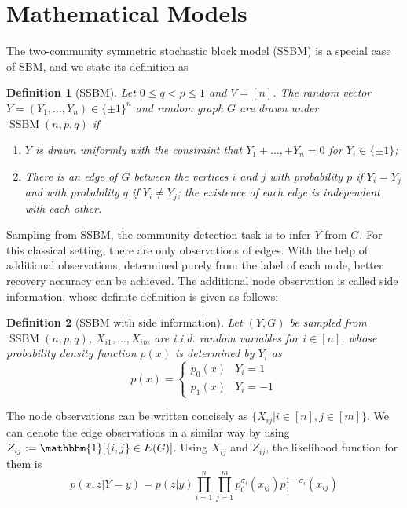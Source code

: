 \documentclass[conference]{IEEEtran}
\newtheorem{definition}{Definition}
\DeclareMathOperator{\SSBM}{SSBM}
\begin{document}
\section{Mathematical Models}
The two-community symmetric stochastic block model (SSBM) is a special case of SBM, and we state
its definition as
\begin{definition}[SSBM]
	Let $0\leq q<p\leq 1$ and $V=[n]$. The random vector $Y=(Y_1,\dots,Y_n)\in \{\pm 1\}^n$ and random graph $G$ are drawn under $\SSBM(n,p,q)$ if
	\begin{enumerate}
		\item $Y$ is drawn uniformly with the constraint that $Y_1 + \dots, + Y_n = 0$ for $Y_i \in \{\pm 1 \}$;
		
		\item There is an edge of $G$ between the vertices $i$ and $j$ with probability $p$ if $Y_i=Y_j$ and with probability $q$ if $Y_i \neq Y_j$; the existence of each edge is independent with each other.
	\end{enumerate}
\end{definition}
Sampling from SSBM, the community detection task is to infer $Y$ from $G$.
For this classical setting, there are only observations of edges. With the help of
additional observations, determined purely from the label of each node, better recovery
accuracy can be achieved. The additional node observation is called side information, whose
definite definition is given as follows:
\begin{definition}[SSBM with side information]
	Let $(Y,G)$ be sampled from $\SSBM(n,p,q)$, $X_{i1}, \dots, X_{im}$ are i.i.d. random variables for $i \in [n]$,
	whose probability density function $p(x)$ is determined by $Y_i$ as
	\begin{equation}
	p(x) = \begin{cases}
	p_0(x) & Y_i = 1 \\
	p_1(x) & Y_i = -1
	\end{cases}
	\end{equation}
\end{definition}
The node observations can be written concisely as $\{X_{ij} | i \in [n], j \in [m]\}$.
We can denote the edge observations in a similar way by using $Z_{ij}:=\mathbbm{1}[\{i,j\} \in E(G)]$.
Using $X_{ij}$ and $Z_{ij}$, the likelihood function for them is
\begin{equation}\label{eq:lh}
    p(x, z| Y=y) = p(z|y)\prod_{i=1}^n \prod_{j=1}^m p^{\sigma_i}_0(x_{ij})p^{1-\sigma_i}_1(x_{ij}) 
\end{equation}
\end{document}
